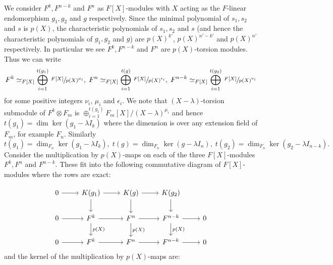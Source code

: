 \documentclass[reqno]{amsart}
\theoremstyle{definition}
\theoremstyle{remark}
\numberwithin{equation}{section}
\begin{document}
We consider $F^k, F^{n-k}$ and $F^n$ as  $F[X]$-modules with $X$ acting as the $F$-linear endomorphism $g_1, g_2$ and $g$ respectively. Since the minimal polynomial of $s_1, s_2$ and $s$ is $p(X)$, the characteristic polynomials of $s_1, s_2$ and $s$ (and hence the characteristic polynomials of  $g_1, g_2$  and $g$) are  $p(X)^{k'}$, $p(X)^{n'-k'}$ and $p(X)^{n'}$ respectively. In particular  we see $F^k, F^{n-k}$ and $F^n$ are  $p(X)$-torsion modules. Thus we can write 
\[
F^k \simeq_{F[X]} \bigoplus_{i=1}^{t(g_1)} \, \sfrac{F[X]}{p(X)^{\mu_i}},\;
F^{n} \simeq_{F[X]} \bigoplus_{i=1}^{t(g)} \,  \sfrac{F[X]}{p(X)^{\epsilon_i}}, \;
F^{n-k} \simeq_{F[X]} \bigoplus_{i=1}^{t(g_2)} \, \sfrac{F[X]}{p(X)^{\nu_i}}
\]
for some positive integers $\nu_i$, $\mu_i$ and $\epsilon_i$. We note that $(X-\lambda)$-torsion submodule of $F^{k}\otimes F_m$ is $\oplus_{i=1}^{t(g_1)} F_m[X]/(X-\lambda)^{\mu_i}$  and hence $t(g_1)=\dim \ker(g_1-\lambda I_{k})$ where the dimension is over any extension field of $F_m$, for example $F_n$. Similarly
\[
  t(g_1)=  \dim_{F_n} \ker(g_1-\lambda I_{k}),\;
  t(g)=  \dim_{F_n} \ker(g-\lambda I_{n}),\;
  t(g_2)=\dim_{F_n} \ker(g_2-\lambda I_{n-k}).
  \]
Consider the multiplication by $p(X)$-maps on each of the three $F[X]$-modules $F^k, F^n$ and $F^{n-k}$. These fit into the following commutative diagram of $F[X]$-modules where the rows are exact:

\begin{equation} \label{eq:snake}
\begin{tikzcd}
0 \arrow[r] & K(g_1) \arrow[r] \arrow[d] & K(g) \arrow[r] \arrow[d] & K(g_2) \arrow[d]    \\
0 \arrow[r] & F^k \arrow[r] \arrow[d,"p(X)"] & F^n \arrow[r] \arrow[d,"p(X)"] & F^{n-k} \arrow[r] \arrow[d,"p(X)"] & 0 \\
0 \arrow[r] & F^k \arrow[r]                  & F^n \arrow[r]                  & F^{n-k} \arrow[r]                  & 0
\end{tikzcd}
\end{equation}
and the kernel of the multiplication by $p(X)$-maps are:
\end{document}
